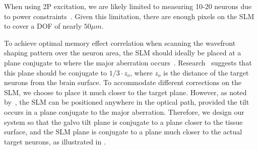 When using 2P excitation, we are likely limited to measuring 10-20 neurons due to power constraints~\cite{Davis2024Optical}. Given this limitation, there are enough pixels on the SLM to cover a DOF of nearly $50\mu m$.








To achieve optimal memory effect correlation when scanning the wavefront shaping pattern over the neuron area, the SLM should ideally be placed at a plane conjugate to where the major aberration occurs~\cite{Mertz:15,Park2015,Tao2017}. Research~\cite{osnabrugge2017generalized,SeeThroughSubmission} suggests that this plane should be conjugate to $1/3\cdot z_o$,  where $z_o$
is the distance of the target neurons from the brain surface.
To accommodate different corrections on the SLM, we choose to place it much closer to the target plane. However, as noted by~\cite{Papadopoulos2020}, the SLM can be positioned anywhere in the optical path, provided the tilt occurs in a plane conjugate to the major aberration. Therefore, we design our system so that the galvo tilt plane is conjugate to a plane closer to the tissue surface, and the SLM plane is conjugate to a plane much closer to the actual target neurons, as illustrated in .

